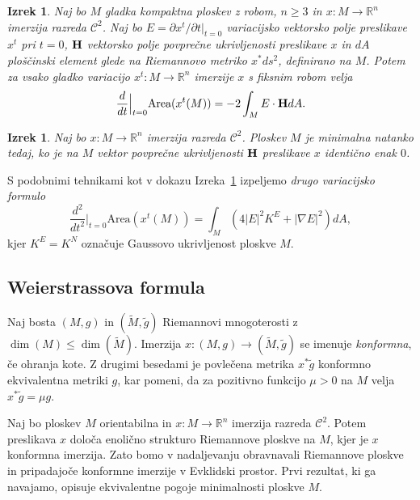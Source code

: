 \documentclass[12pt,a4paper,twoside]{article}
\theoremstyle{definition} %
\theoremstyle{plain} %
\newtheorem{izrek}[definicija]{Izrek}
\numberwithin{equation}{section}  %
\newcommand{\R}{\mathbb R}
\begin{document}
\begin{izrek} \label{izr:1-var-formula}
Naj bo $M$ gladka kompaktna ploskev z robom, $n \geq 3$ in $x \colon M \to \R^{n}$ imerzija razreda $\mathcal{C}^2$. Naj bo $E = \partial{x^{t}} / \partial{t}|_{t=0}$ variacijsko vektorsko polje preslikave $x^{t}$ pri $t=0$, $\textbf{\textup{H}}$ vektorsko polje povprečne ukrivljenosti preslikave $x$ in $dA$ ploščinski element glede na Riemannovo metriko $x^{*}ds^2$, definirano na $M$.
Potem za vsako gladko variacijo $x^{t} \colon M \to \R^{n}$ imerzije $x$ s fiksnim robom velja
\begin{equation} \label{eq:1-var-formula}
\frac{d}{dt} \Big|_{t=0} \text{Area}(x^{t}(M)) = -2 \int_{M} {E \cdot \textbf{\textup{H}} dA}.
\end{equation}
\end{izrek}

\begin{izrek}
Naj bo $x \colon M \to \R^{n}$ imerzija razreda $\mathcal{C}^2$. Ploskev $M$ je minimalna natanko tedaj, ko je na $M$ vektor povprečne ukrivljenosti $\textbf{\textup{H}}$ preslikave $x$ identično enak $0$.
\end{izrek}

S podobnimi tehnikami kot v dokazu Izreka~\ref{izr:1-var-formula} izpeljemo \emph{drugo variacijsko formulo}
\begin{equation}
\frac{d^2}{dt^2} \Big|_{t=0} \text{Area}(x^{t}(M)) = \int_{M} {(4|E|^{2} K^{E} + |\nabla{E}|^2) dA},
\end{equation}
kjer $K^{E} = K^{N}$ označuje Gaussovo ukrivljenost ploskve $M$.

\subsection{Weierstrassova formula}
%
Naj bosta $(M,g)$ in $(\widetilde{M},\tilde{g})$ Riemannovi mnogoterosti z $\dim(M) \leq \dim(\widetilde{M})$.
Imerzija $x \colon (M,g) \to (\widetilde{M}, \tilde{g})$ se imenuje \emph{konformna}, če ohranja kote.
Z drugimi besedami je povlečena metrika $x^{*}\tilde{g}$ konformno ekvivalentna metriki $g$, kar pomeni, da za pozitivno funkcijo $\mu > 0$ na $M$ velja $x^{*}\tilde{g} = \mu g$.

Naj bo ploskev $M$ orientabilna in $x \colon M \to \R^{n}$ imerzija razreda $\mathcal{C}^2$. Potem preslikava $x$ določa enolično strukturo Riemannove ploskve na $M$, kjer je $x$ konformna imerzija. Zato bomo v nadaljevanju obravnavali Riemannove ploskve in pripadajoče konformne imerzije v Evklidski prostor.
Prvi rezultat, ki ga navajamo, opisuje ekvivalentne pogoje minimalnosti ploskve $M$.
\end{document}
